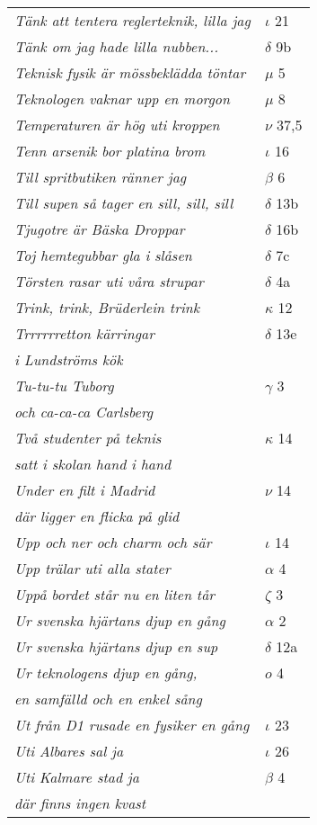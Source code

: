 \documentclass[a6paper,10pt]{article}
\begin{document}
\newpage
\begin{table}[!h]
\begin{tabular}{l l}
\textit{Tänk att tentera reglerteknik, lilla jag}&$\iota$ 21\\
\textit{Tänk om jag hade lilla nubben...}	&$\delta$ 9b\\
\textit{Teknisk fysik är mössbeklädda töntar}	&$\mu$ 5\\
\textit{Teknologen vaknar upp en morgon}    &$\mu$ 8\\
\textit{Temperaturen är hög uti kroppen}	&$\nu$ 37,5\\
\textit{Tenn arsenik bor platina brom}	&$\iota$ 16\\
\textit{Till spritbutiken ränner jag}	&$\beta$ 6\\
\textit{Till supen så tager en sill, sill, sill}	&$\delta$ 13b\\
\textit{Tjugotre är Bäska Droppar}	&$\delta$ 16b\\
\textit{Toj hemtegubbar gla i slåsen}	&$\delta$ 7c\\
\textit{Törsten rasar uti våra strupar}	&$\delta$ 4a\\
\textit{Trink, trink, Brüderlein trink}	&$\kappa$ 12\\
\textit{Trrrrrretton kärringar}	&$\delta$ 13e\\
\textit{i Lundströms kök} &\\
\textit{Tu-tu-tu Tuborg}	&$\gamma$ 3\\
\textit{och ca-ca-ca Carlsberg} &\\
\textit{Två studenter på teknis}	&$\kappa$ 14\\
\textit{satt i skolan hand i hand} &\\
\textit{Under en filt i Madrid}	&$\nu$ 14\\
\textit{där ligger en flicka på glid} &\\
\textit{Upp och ner och charm och sär}	&$\iota$ 14\\
\textit{Upp trälar uti alla stater}	&$\alpha$ 4\\
\textit{Uppå bordet står nu en liten tår}	&$\zeta$ 3\\
\textit{Ur svenska hjärtans djup en gång}	&$\alpha$ 2\\
\textit{Ur svenska hjärtans djup en sup}	&$\delta$ 12a\\
\textit{Ur teknologens djup en gång,}	&$o$ 4\\
\textit{en samfälld och en enkel sång} &\\
\textit{Ut från D1 rusade en fysiker en gång} &$\iota$ 23\\
\textit{Uti Albares sal ja} &$\iota$ 26\\
\textit{Uti Kalmare stad ja}	&$\beta$ 4\\
\textit{där finns ingen kvast} &\\
\end{tabular}
\end{table}
\end{document}
